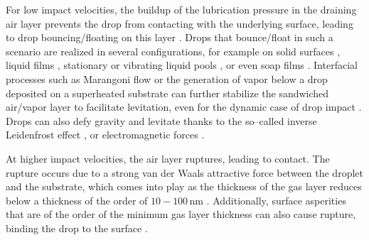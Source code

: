 For low impact velocities, the buildup of the lubrication pressure in the draining air layer prevents the drop from contacting with the underlying surface, leading to drop bouncing/floating on this layer \citep{davis1989lubrication, yiantsios1990buoyancy, yiantsios1991close, smith2003air, van2012direct}. Drops that bounce/float in such a scenario are realized in several configurations, for example on solid surfaces \citep{kolinski2014drops, de2015wettability}, liquid films \citep{pan2007dynamics, hao2015superhydrophobic, tang2018bouncing, tang2019bouncing}, stationary \citep{rodriguez1985some, klyuzhin2010persisting, wu2020small} or vibrating liquid pools \citep{couder2005bouncing, couder2005walking}, or even soap films \citep{gilet2009fluid}. 
Interfacial processes such as Marangoni flow \citep{geri2017thermal} or the generation of vapor below a drop deposited on a superheated substrate \citep[the Leidenfrost effect where the liquid levitates on a cushion of its own vapor,][]{Boerhaave1732, leidenfrost1756,quere2013leidenfrost, chantelot2021leidenfrost} can further stabilize the sandwiched air/vapor layer to facilitate levitation, even for the dynamic case of drop impact \citep{chandra1991collision,tran2012drop, shirota2016dynamic}. Drops can also defy gravity and levitate thanks to the so--called inverse Leidenfrost effect \citep{adda2016inverse, gauthier2019capillary, gauthier2019self}, or electromagnetic forces \citep{pal2017control, singh2018levitation}. 

At higher impact velocities, the air layer ruptures, leading to contact. The rupture occurs due to a strong van der Waals attractive force between the droplet and the substrate, which comes into play as the thickness of the gas layer reduces below a thickness of the order of $10 - 100\,\si{\nano\meter}$ \citep[see appendix~\ref{App:FilmRupture}, and][]{charles1960coalescence, SprittlesPhysRevLett.124.084501, zhang2021thin}. Additionally, surface asperities that are of the order of the minimum gas layer thickness can also cause rupture, binding the drop to the surface \citep{thoroddsen2003air, kolinski2014drops, li_vakarelski_thoroddsen_2015}. 

